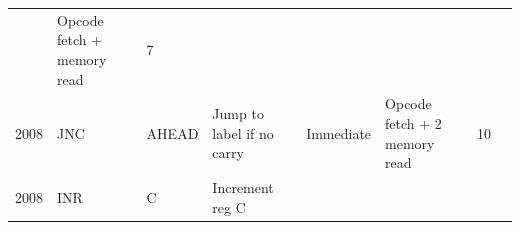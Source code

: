 \documentclass[11pt,twocolumn]{article}
\begin{document}
\begin{longtable}[]{@{}llllllll@{}}
\begin{minipage}[t]{0.09\columnwidth}
\end{minipage} & \begin{minipage}[t]{0.25\columnwidth}\raggedright
Opcode fetch + memory read\strut
\end{minipage} & \begin{minipage}[t]{0.05\columnwidth}\raggedright
7\strut
\end{minipage} & \begin{minipage}[t]{0.03\columnwidth}\raggedright
\strut
\end{minipage}\tabularnewline
\begin{minipage}[t]{0.04\columnwidth}\raggedright
2008\strut
\end{minipage} & \begin{minipage}[t]{0.05\columnwidth}\raggedright
JNC\strut
\end{minipage} & \begin{minipage}[t]{0.05\columnwidth}\raggedright
AHEAD\strut
\end{minipage} & \begin{minipage}[t]{0.23\columnwidth}\raggedright
Jump to label if no carry\strut
\end{minipage} & \begin{minipage}[t]{0.09\columnwidth}\raggedright
Immediate\strut
\end{minipage} & \begin{minipage}[t]{0.25\columnwidth}\raggedright
Opcode fetch + 2 memory read\strut
\end{minipage} & \begin{minipage}[t]{0.05\columnwidth}\raggedright
10\strut
\end{minipage} & \begin{minipage}[t]{0.03\columnwidth}\raggedright
\strut
\end{minipage}\tabularnewline
\begin{minipage}[t]{0.04\columnwidth}\raggedright
2008\strut
\end{minipage} & \begin{minipage}[t]{0.05\columnwidth}\raggedright
INR\strut
\end{minipage} & \begin{minipage}[t]{0.05\columnwidth}\raggedright
C\strut
\end{minipage} & \begin{minipage}[t]{0.23\columnwidth}\raggedright
Increment reg C\strut
\end{minipage} & \begin{minipage}[t]{0.09\columnwidth}\raggedright

\end{minipage}
\end{longtable}
\end{document}
